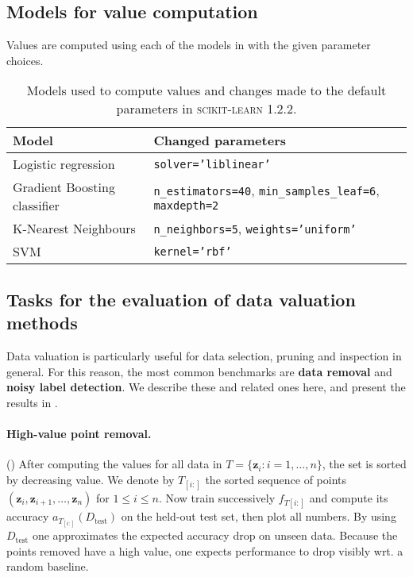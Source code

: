 \documentclass[10pt]{article}
\newcommand{\tmdfn}[1]{\textbf{#1}}
\newcommand{\tmmathbf}[1]{\ensuremath{\boldsymbol{#1}}}
\newcommand{\tmname}[1]{\textsc{#1}}
\newcommand{\tmop}[1]{\ensuremath{\operatorname{#1}}}
\newcommand{\tmstrong}[1]{\textbf{#1}}
\newcommand{\python}[1]{\texttt{#1}}
\begin{document}
\subsection{Models for value computation}

Values are computed using each of the models in 
with the given parameter choices.

\begin{table}[h]
  \begin{tabular}{ll}
    {\tmstrong{Model}} & {\tmstrong{Changed parameters}}\\
    \hline
    Logistic regression & {\small{{\python{solver='liblinear'}}}}\\
    Gradient Boosting classifier & {\small{{\python{n\_estimators=40}},
    {\python{min\_samples\_leaf=6}}, {\python{maxdepth=2}}}}\\
    K-Nearest Neighbours & {\small{{\python{n\_neighbors=5}},
    {\python{weights='uniform'}}}}\\
    SVM & {\small{{\python{kernel='rbf'}}}}
  \end{tabular}
  \caption{\label{tab:models-for-values}Models used to compute values and
  changes made to the default parameters in {\tmname{scikit-learn}} 1.2.2.}
\end{table}

\subsection{Tasks for the evaluation of data valuation
methods}\label{sec:evaluation-data-val}

Data valuation is particularly useful for data selection, pruning and
inspection in general. For this reason, the most common benchmarks are
{\tmdfn{data removal}} and {\tmdfn{noisy label detection}}. We describe these
and related ones here, and present the results in .

\paragraph{High-value point removal.}() After computing
the values for all data in $T = \{ \tmmathbf{z}_i : i = 1, \ldots, n \}$, the
set is sorted by decreasing value. We denote by $T_{[i :]}$ the sorted
sequence of points $(\tmmathbf{z}_i, \tmmathbf{z}_{i + 1}, \ldots,
\tmmathbf{z}_n)$ for $1 \leqslant i \leqslant n$. Now train successively $f_{T
[i :]}$ and compute its accuracy $a_{T_{[i :]}} (D_{\tmop{test}})$ on the
held-out test set, then plot all numbers. By using $D_{\tmop{test}}$ one
approximates the expected accuracy drop on unseen data. Because the points
removed have a high value, one expects performance to drop visibly wrt. a
random baseline.
\end{document}
